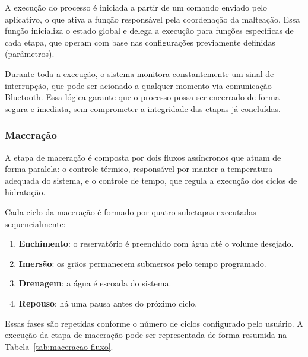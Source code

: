 A execução do processo é iniciada a partir de um comando enviado pelo aplicativo, o que ativa a função responsável pela coordenação da malteação. Essa função inicializa o estado global e delega a execução para funções específicas de cada etapa, que operam com base nas configurações previamente definidas (parâmetros).

Durante toda a execução, o sistema monitora constantemente um sinal de interrupção, que pode ser acionado a qualquer momento via comunicação Bluetooth. Essa lógica garante que o processo possa ser encerrado de forma segura e imediata, sem comprometer a integridade das etapas já concluídas.

\subsubsection{Maceração}

A etapa de maceração é composta por dois fluxos assíncronos que atuam de forma paralela: o controle térmico, responsável por manter a temperatura adequada do sistema, e o controle de tempo, que regula a execução dos ciclos de hidratação.

Cada ciclo da maceração é formado por quatro subetapas executadas sequencialmente:

\begin{enumerate}
    \item \textbf{Enchimento}: o reservatório é preenchido com água até o volume desejado.
    \item \textbf{Imersão}: os grãos permanecem submersos pelo tempo programado.
    \item \textbf{Drenagem}: a água é escoada do sistema.
    \item \textbf{Repouso}: há uma pausa antes do próximo ciclo.
\end{enumerate}

Essas fases são repetidas conforme o número de ciclos configurado pelo usuário. A execução da etapa de maceração pode ser representada de forma resumida na Tabela~\ref{tab:maceracao-fluxo}.

